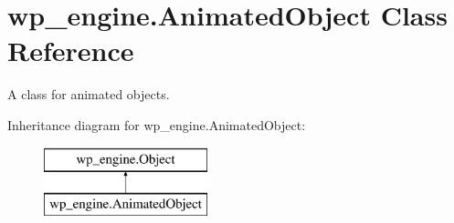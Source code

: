 \hypertarget{classwp__engine_1_1_animated_object}{\section{wp\-\_\-engine.\-Animated\-Object Class Reference}
\label{classwp__engine_1_1_animated_object}
}


A class for animated objects.  


Inheritance diagram for wp\-\_\-engine.\-Animated\-Object\-:\begin{figure}[H]
\begin{center}
\leavevmode
\includegraphics[height=2.000000cm]{classwp__engine_1_1_animated_object}
\end{center}
\end{figure}
